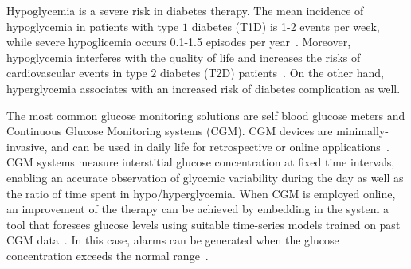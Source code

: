 Hypoglycemia is a severe risk in diabetes therapy. 
The mean incidence of hypoglycemia in patients with type $1$ diabetes (T1D) 
is 1-2 events per week, while severe hypoglicemia occurs 0.1-1.5 episodes per year~\cite{van2016continuous}. 
Moreover, hypoglycemia interferes with the quality of life and increases the risks of cardiovascular events in type $2$ diabetes (T2D) patients~\cite{van2016continuous}. On the other hand, hyperglycemia associates with an increased risk of diabetes complication as well.


The most common glucose monitoring solutions are self blood glucose meters and Continuous Glucose Monitoring systems (\ac{CGM}). 
CGM devices are minimally-invasive, and can be used in daily life for retrospective or online applications~\cite{vigersky2017role}. 
CGM systems measure interstitial glucose concentration at fixed time intervals, enabling an accurate observation of glycemic variability during the day as well as the ratio of time spent in hypo/hyperglycemia. 
When CGM is employed online, an improvement of the therapy can be achieved by embedding in the system a tool that foresees glucose levels using suitable time-series models trained on past  CGM  data~\cite{sparacino2007glucose}. In this case, alarms can be generated when the glucose concentration exceeds the normal range~\cite{vigersky2017role}.

%
%
%
%
%

